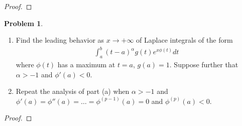 \documentclass[12pt]{article}
\theoremstyle{definition}
\newtheorem{problem}{Problem}
\begin{document}
\begin{proof}
\end{proof}
\newpage


\begin{problem}
  \begin{enumerate}
    \item Find the leading behavior as $x\to + \infty$ of Laplace integrals of the form
      \begin{align*}
        \int_a^b (t-a) ^\alpha g(t) e^{x\phi(t)} dt
      \end{align*}
      where $\phi(t)$ has a maximum at $t = a$, $g(a) = 1$. Suppose further that $\alpha > -1$ and $\phi'(a) < 0$.
    \item Repeat the analysis of part (a) when $\alpha > -1$
      and $\phi'(a) = \phi''(a) = \dots = \phi^{(p-1)}(a) = 0$ and $\phi^{(p)}(a) < 0$.
  \end{enumerate}
\end{problem}

\begin{proof}
\end{proof}
\newpage
\end{document}
